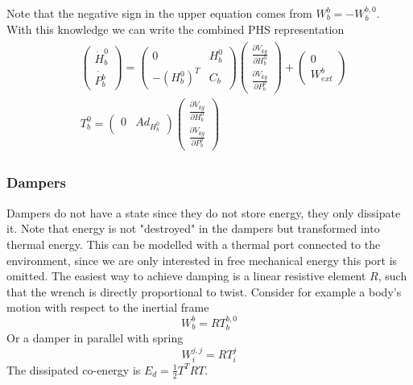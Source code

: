 \documentclass[a4paper,twoside, openright,12pt]{report}
\begin{document}
Note that the negative sign in the upper equation comes from $W_b^b = - W_b^{b,0} $.\\
With this knowledge we can write the combined PHS representation
\begin{eqnarray} \label{EQ:PHSinertia}
\begin{aligned}
&\begin{pmatrix}\dot{H}_b^0 \\ \dot{P_b^b}\end{pmatrix} =
\begin{pmatrix} 0 & H_b^0  \\
- (H_b^0)^T & C_b\end{pmatrix}
\begin{pmatrix}\frac{\partial V_{kg}}{\partial H_b^0} \\ \frac{\partial V_{kg}}{\partial P_b^b}\end{pmatrix}+
\begin{pmatrix}0 \\ W_{ext}^b\end{pmatrix} \\
&T_b^0 = \begin{pmatrix}0 & Ad_{H_b^0}\end{pmatrix}
\begin{pmatrix}\frac{\partial V_{kg}}{\partial H_b^0} \\ \frac{\partial V_{kg}}{\partial P_b^b}\end{pmatrix}
\end{aligned}
\end{eqnarray}


\subsubsection{Dampers}\label{SSS:Dampers}
Dampers do not have a state since they do not store energy, they only dissipate it. Note that energy is not "destroyed" in the dampers but transformed into thermal energy. This can be modelled with a thermal port connected to the environment, since we are only interested in free mechanical energy this port is omitted. The easiest way to achieve damping is a linear resistive element $R$, such that the wrench is directly proportional to twist. Consider for example a body's motion with respect to the inertial frame
\begin{equation}
	W_b^b = R T_b^{b,0}
\end{equation}
Or a damper in parallel with spring
\begin{equation}
	W_i^{j,j} = R T_i^{j}
\end{equation}
The dissipated co-energy is $E_d = \frac{1}{2}T^T R T$.
\end{document}
